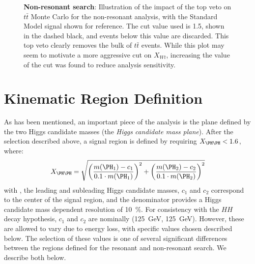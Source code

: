 \begin{figure}
\centering
{}
\caption{\label{fig:Xwt-nonres} \textbf{Non-resonant search}: Illustration of the impact of the top veto on $t\bar{t}$ 
Monte Carlo for the non-resonant analysis, with the Standard Model signal shown for reference. The cut value 
used is 1.5, shown in the dashed black, and events below this value are discarded. This top veto clearly removes 
the bulk of $t\bar{t}$ events. While this plot may seem to motivate a more aggressive cut on $X_{Wt}$, increasing 
the value of the cut was found to reduce analysis sensitivity.}
\end{figure}



\FloatBarrier
\clearpage
\section{Kinematic Region Definition}
\label{sec:kinematic-reg}
As has been mentioned, an important piece of the analysis is the plane defined by the 
two Higgs candidate masses (the \emph{Higgs candidate mass plane}). After the selection
described above, a signal region is defined by requiring $X_{\higgs\higgs} < 1.6$, where:
\begin{equation}
	\label{eqn:xhh-def}
	X_{\higgs\higgs} = \sqrt{\qty(\frac{\mh1 - c_1}{0.1\cdot\mh1})^{2} + 
	\qty(\frac{\mh2 - c_2}{0.1\cdot\mh2})^{2}}
\end{equation}
with ,  the leading and subleading Higgs candidate masses, $c_{1}$ and $c_{2}$ correspond
to the center of the signal region, and the denominator provides a Higgs candidate mass 
dependent resolution of 10~\%. For consistency with the $HH$ decay hypothesis, $c_{1}$ and $c_{2}$
are nominally (\SI{125}{\GeV}, \SI{125}{\GeV}). However, these are allowed to vary due to 
energy loss, with specific values chosen described below. The selection of these values is 
one of several significant differences between the regions defined for the resonant and non-resonant search.
We describe both below.

